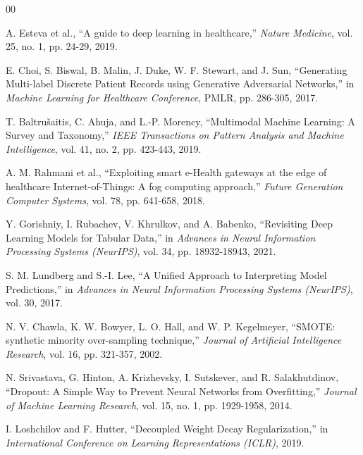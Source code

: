 \begin{thebibliography}{00}

A. Esteva et al., ``A guide to deep learning in healthcare,'' \textit{Nature Medicine}, vol. 25, no. 1, pp. 24-29, 2019.

E. Choi, S. Biswal, B. Malin, J. Duke, W. F. Stewart, and J. Sun, ``Generating Multi-label Discrete Patient Records using Generative Adversarial Networks,'' in \textit{Machine Learning for Healthcare Conference}, PMLR, pp. 286-305, 2017.

T. Baltrušaitis, C. Ahuja, and L.-P. Morency, ``Multimodal Machine Learning: A Survey and Taxonomy,'' \textit{IEEE Transactions on Pattern Analysis and Machine Intelligence}, vol. 41, no. 2, pp. 423-443, 2019.

A. M. Rahmani et al., ``Exploiting smart e-Health gateways at the edge of healthcare Internet-of-Things: A fog computing approach,'' \textit{Future Generation Computer Systems}, vol. 78, pp. 641-658, 2018.

Y. Gorishniy, I. Rubachev, V. Khrulkov, and A. Babenko, ``Revisiting Deep Learning Models for Tabular Data,'' in \textit{Advances in Neural Information Processing Systems (NeurIPS)}, vol. 34, pp. 18932-18943, 2021.

S. M. Lundberg and S.-I. Lee, ``A Unified Approach to Interpreting Model Predictions,'' in \textit{Advances in Neural Information Processing Systems (NeurIPS)}, vol. 30, 2017.

N. V. Chawla, K. W. Bowyer, L. O. Hall, and W. P. Kegelmeyer, ``SMOTE: synthetic minority over-sampling technique,'' \textit{Journal of Artificial Intelligence Research}, vol. 16, pp. 321-357, 2002.

N. Srivastava, G. Hinton, A. Krizhevsky, I. Sutskever, and R. Salakhutdinov, ``Dropout: A Simple Way to Prevent Neural Networks from Overfitting,'' \textit{Journal of Machine Learning Research}, vol. 15, no. 1, pp. 1929-1958, 2014.

I. Loshchilov and F. Hutter, ``Decoupled Weight Decay Regularization,'' in \textit{International Conference on Learning Representations (ICLR)}, 2019.


\end{thebibliography}
